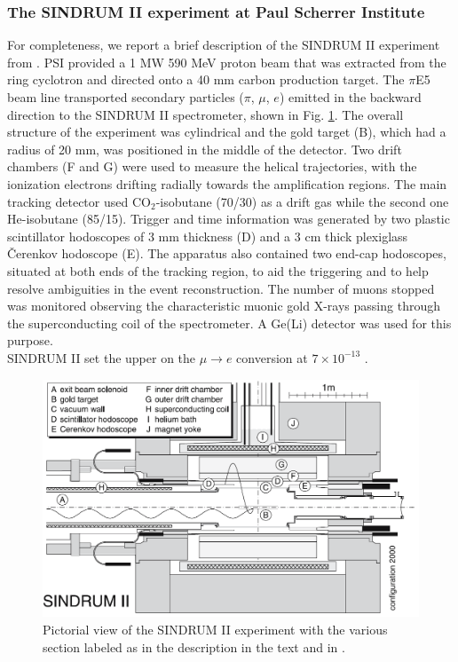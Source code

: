 \documentclass[12pt,a4paper,openright, oneside, titlepage]{book} %
\begin{document}
\subsubsection{The SINDRUM II experiment at Paul Scherrer Institute}
For completeness, we report a brief description of the SINDRUM II experiment from \cite{SINDRUMII}. 
PSI provided a 1 MW 590 MeV proton beam that was extracted from the ring cyclotron and directed onto a 40 mm carbon production target. 
The $\pi$E5 beam line transported secondary particles ($\pi$, $\mu$, $e$) emitted in the backward direction to the SINDRUM II spectrometer, shown in Fig. \ref{_SINDRUM_II}.
The overall structure of the experiment was cylindrical and the gold target (B), which had a radius of 20 mm, was positioned in the middle of the detector. 
Two drift chambers (F and G) were used to measure the helical trajectories, with the ionization electrons drifting radially towards the amplification regions. 
The main tracking detector used CO$_2$-isobutane (70/30) as a drift gas while the second one He-isobutane (85/15).
Trigger and time information was generated by two plastic scintillator hodoscopes of 3 mm thickness (D) and a 3 cm thick plexiglass \v{C}erenkov hodoscope (E). 
The apparatus also contained two end-cap hodoscopes, situated at both ends of the tracking region, to aid the triggering and to help resolve ambiguities in the event reconstruction. 
The number of muons stopped was monitored observing the characteristic muonic gold X-rays passing through the superconducting coil of the spectrometer. 
A Ge(Li) detector was used for this purpose.\\
SINDRUM II set the upper on the $\mu\rightarrow e$ conversion at $7\times10^{-13}$ \cite{SINDRUMII}.\\

\begin{figure}[h!]
\centering
\includegraphics[scale=0.6]{SINDRUM_II}
\caption[SINDRUM II]{Pictorial view of the SINDRUM II experiment with the various section labeled as in the description in the text and in \cite{SINDRUMII}.}
\label{_SINDRUM_II}
\end{figure}
\end{document}
